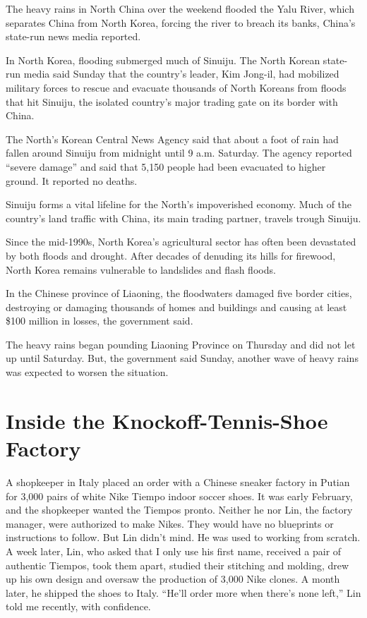 ﻿\documentclass[12pt]{article}
\begin{document}
The heavy rains in North China over the weekend flooded the Yalu River, which separates China from
North Korea, forcing the river to breach its banks, China's state-run news media reported.

In North Korea, flooding submerged much of Sinuiju. The North Korean state-run media said Sunday
that the country's leader, Kim Jong-il, had mobilized military forces to rescue and evacuate
thousands of North Koreans from floods that hit Sinuiju, the isolated country's major trading gate
on its border with China.

The North's Korean Central News Agency said that about a foot of rain had fallen around Sinuiju from
midnight until 9 a.m. Saturday. The agency reported ``severe damage'' and said that 5,150 people had
been evacuated to higher ground. It reported no deaths.

Sinuiju forms a vital lifeline for the North's impoverished economy. Much of the country's land
traffic with China, its main trading partner, travels trough Sinuiju.

Since the mid-1990s, North Korea's agricultural sector has often been devastated by both floods and
drought. After decades of denuding its hills for firewood, North Korea remains vulnerable to
landslides and flash floods.

In the Chinese province of Liaoning, the floodwaters damaged five border cities, destroying or
damaging thousands of homes and buildings and causing at least \$100 million in losses, the
government said.

The heavy rains began pounding Liaoning Province on Thursday and did not let up until Saturday. But,
the government said Sunday, another wave of heavy rains was expected to worsen the situation.

\pagebreak
\section{Inside the Knockoff-Tennis-Shoe Factory}

\lettrine{A}{} shopkeeper in Italy placed an order with a Chinese sneaker
factory in Putian for 3,000 pairs of white Nike Tiempo indoor soccer shoes. It was early February,
and the shopkeeper wanted the Tiempos pronto. Neither he nor Lin, the factory manager, were
authorized to make Nikes. They would have no blueprints or instructions to follow. But Lin didn't
mind. He was used to working from scratch. A week later, Lin, who asked that I only use his first
name, received a pair of authentic Tiempos, took them apart, studied their stitching and molding,
drew up his own design and oversaw the production of 3,000 Nike clones. A month later, he shipped
the shoes to Italy. ``He'll order more when there's none left,'' Lin told me recently, with
confidence.
\end{document}
